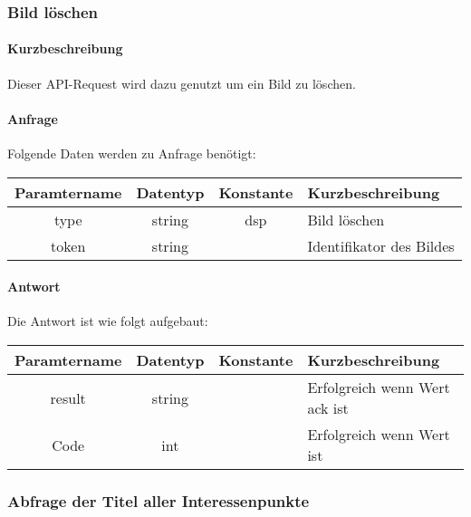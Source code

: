 \subsubsection{Bild löschen}
\paragraph{Kurzbeschreibung}Dieser API-Request wird dazu genutzt um ein Bild zu löschen.
\paragraph{Anfrage}Folgende Daten werden zu Anfrage benötigt:
\begin{table}[H]
	\begin{tabular}{|c|c|c|p{6.5cm}|}
		\hline
		\textbf{Paramtername} & \textbf{Datentyp} & \textbf{Konstante} & \textbf{Kurzbeschreibung}                                                                                               \\ \hline
		type                & string            & dsp                & Bild löschen\\ \hline
		token               & string            &                    & Identifikator des Bildes \\ \hline
	\end{tabular}
\end{table}
\paragraph{Antwort}Die Antwort ist wie folgt aufgebaut:
\begin{table}[H]
	\begin{tabular}{|c|c|c|p{6.5cm}|}
		\hline
		\textbf{Paramtername} & \textbf{Datentyp} & \textbf{Konstante} & \textbf{Kurzbeschreibung}                                                                                               \\ \hline
		result              & string           &                 & Erfolgreich wenn Wert {\glqq ack\grqq} ist \\ \hline
		Code                & int              &                 & Erfolgreich wenn Wert {\glqq 0\grqq} ist \\ \hline
	\end{tabular}
\end{table}
\subsubsection{Abfrage der Titel aller Interessenpunkte}
